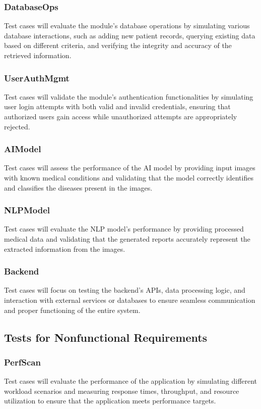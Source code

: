 \documentclass[12pt, titlepage]{article}
\begin{document}
\subsubsection{DatabaseOps}
Test cases will evaluate the module's database operations by simulating various database interactions, such as adding new patient records, querying existing data based on different criteria, and verifying the integrity and accuracy of the retrieved information.

\subsubsection{UserAuthMgmt}
Test cases will validate the module's authentication functionalities by simulating user login attempts with both valid and invalid credentials, ensuring that authorized users gain access while unauthorized attempts are appropriately rejected.

\subsubsection{AIModel}
Test cases will assess the performance of the AI model by providing input images with known medical conditions and validating that the model correctly identifies and classifies the diseases present in the images.

\subsubsection{NLPModel}
Test cases will evaluate the NLP model's performance by providing processed medical data and validating that the generated reports accurately represent the extracted information from the images.

\subsubsection{Backend}
Test cases will focus on testing the backend's APIs, data processing logic, and interaction with external services or databases to ensure seamless communication and proper functioning of the entire system.

\subsection{Tests for Nonfunctional Requirements}

\subsubsection{PerfScan}	
Test cases will evaluate the performance of the application by simulating different workload scenarios and measuring response times, throughput, and resource utilization to ensure that the application meets performance targets.
\end{document}
